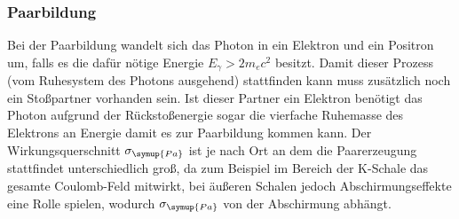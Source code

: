 \subsubsection{Paarbildung}
Bei der Paarbildung wandelt sich das Photon in ein Elektron und ein Positron um, falls es die dafür nötige Energie $E_{\gamma}>2m_ec^2$ besitzt.
Damit dieser Prozess (vom Ruhesystem des Photons ausgehend) stattfinden kann muss zusätzlich noch ein Stoßpartner vorhanden sein.
Ist dieser Partner ein Elektron benötigt das Photon aufgrund der Rückstoßenergie sogar die vierfache Ruhemasse des Elektrons an Energie damit es zur Paarbildung kommen kann.
Der Wirkungsquerschnitt $\sigma_{\symup{Pa}}$ ist je nach Ort an dem die Paarerzeugung stattfindet unterschiedlich groß, da zum Beispiel im Bereich der K-Schale das gesamte Coulomb-Feld mitwirkt, bei äußeren Schalen jedoch Abschirmungseffekte eine Rolle spielen, wodurch $\sigma_{\symup{Pa}}$ von der Abschirmung abhängt.



